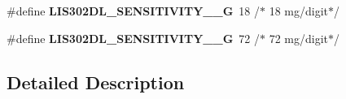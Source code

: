 \begin{DoxyCompactItemize}
\item 
\hypertarget{group___s_t_m32_f4___d_i_s_c_o_v_e_r_y___l_i_s302_d_l___exported___constants_ga9ffc33f3cf322d266d7aa71870f79293}{\#define {\bfseries L\-I\-S302\-D\-L\-\_\-\-S\-E\-N\-S\-I\-T\-I\-V\-I\-T\-Y\-\_\-\_\-G}~18  /$\ast$ 18 mg/digit$\ast$/}\label{group___s_t_m32_f4___d_i_s_c_o_v_e_r_y___l_i_s302_d_l___exported___constants_ga9ffc33f3cf322d266d7aa71870f79293}

\item 
\hypertarget{group___s_t_m32_f4___d_i_s_c_o_v_e_r_y___l_i_s302_d_l___exported___constants_gae454bd7f99331d14f9b5ee518e2deb6a}{\#define {\bfseries L\-I\-S302\-D\-L\-\_\-\-S\-E\-N\-S\-I\-T\-I\-V\-I\-T\-Y\-\_\-\_\-G}~72  /$\ast$ 72 mg/digit$\ast$/}\label{group___s_t_m32_f4___d_i_s_c_o_v_e_r_y___l_i_s302_d_l___exported___constants_gae454bd7f99331d14f9b5ee518e2deb6a}

\end{DoxyCompactItemize}


\subsection{Detailed Description}

